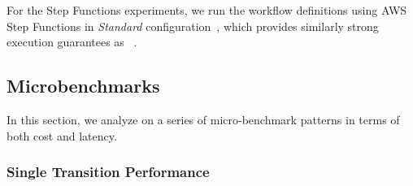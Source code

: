 For the Step Functions experiments, we run the workflow definitions using AWS
Step Functions in \emph{Standard}
configuration~\cite{aws-step-functions-standard-vs-express}, which provides
similarly strong execution guarantees as
\name{}~\cite{aws-step-functions-exec-gntee}.



\subsection{Microbenchmarks}\label{sec:eval:micro}

In this section, we analyze \name{} on a series of micro-benchmark patterns in
terms of both cost and latency.

\subsubsection{Single Transition Performance}

